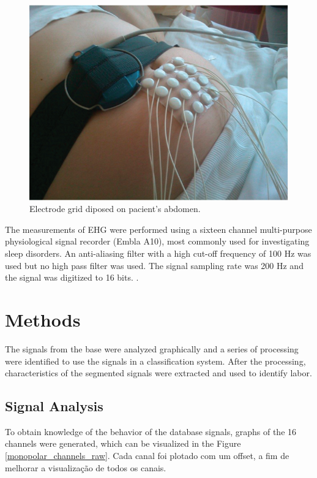 \documentclass[bioengineering,article,submit,moreauthors,pdftex,10pt,a4paper]{mdpi}
\begin{document}
\begin{figure}[H]
	\caption{\label{recording_setup} Electrode grid diposed on pacient's abdomen.}
	\begin{center}
		\includegraphics[scale=0.6]{imagens/coletaBaseIrlanda.png} 		
	\end{center}
\end{figure}

The measurements of EHG were performed using a sixteen channel multi-purpose physiological signal recorder (Embla A10), most commonly used for investigating sleep disorders. An anti-aliasing filter with a high cut-off frequency of 100 Hz was used but no high pass filter was used. The signal sampling rate was 200 Hz and the signal was digitized to 16 bits.  \cite{ref-islddatabase}.
 
\section{Methods}

The signals from the base were analyzed graphically and a series of processing were identified to use the signals in a classification system. After the processing, characteristics of the segmented signals were extracted and used to identify labor.

\subsection{Signal Analysis}

To obtain knowledge of the behavior of the database signals, graphs of the 16 channels were generated, which can be visualized in the Figure \ref{monopolar_channels_raw}. Cada canal foi plotado com um offset, a fim de melhorar a visualização de todos os canais.
\end{document}
